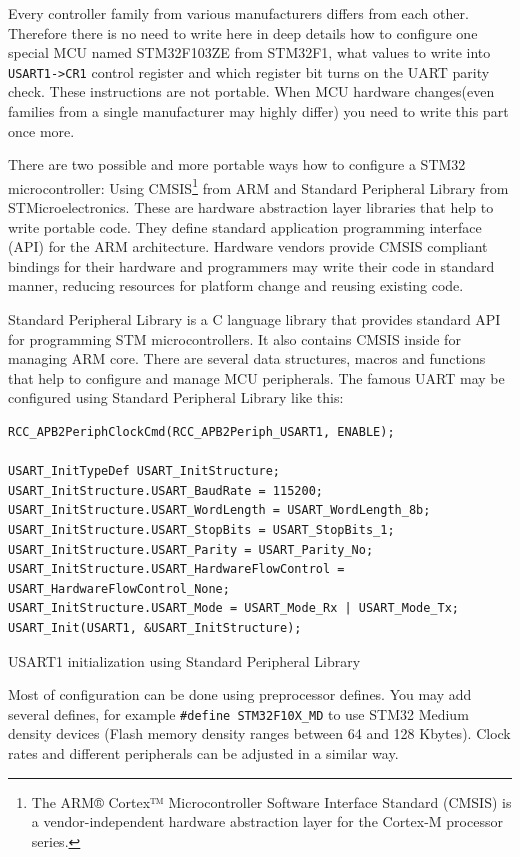 Every controller family from various manufacturers differs from each other.
Therefore there is no need to write here in deep details how to configure one
special MCU named STM32F103ZE from STM32F1, what values to write into
\texttt{USART1->CR1} control register and which register bit turns on the UART
parity check. These instructions are not portable. When MCU hardware
changes(even families from a single manufacturer may highly differ) you need to
write this part once more.

There are two possible and more portable ways how to configure a STM32
microcontroller: Using CMSIS\footnote{The ARM® Cortex™ Microcontroller Software
Interface Standard (CMSIS) is a vendor-independent hardware abstraction layer for the Cortex-M processor series.}
from ARM and Standard Peripheral Library from STMicroelectronics. These are
hardware abstraction layer libraries that help to write portable code. They
define standard  application programming interface (API) for the ARM
architecture. Hardware vendors provide CMSIS compliant bindings for their
hardware and programmers may write their code in standard manner, reducing
resources for platform change and reusing existing code.

Standard Peripheral Library is a C language library that provides standard API
for programming STM microcontrollers. It also contains CMSIS inside for
managing ARM core. There are several data structures, macros and functions that
help to configure and manage MCU peripherals.
The famous UART may be configured using Standard Peripheral Library like this:

\begin{listing}[H]
\begin{verbatim}
RCC_APB2PeriphClockCmd(RCC_APB2Periph_USART1, ENABLE);

USART_InitTypeDef USART_InitStructure;
USART_InitStructure.USART_BaudRate = 115200;
USART_InitStructure.USART_WordLength = USART_WordLength_8b;
USART_InitStructure.USART_StopBits = USART_StopBits_1;
USART_InitStructure.USART_Parity = USART_Parity_No;
USART_InitStructure.USART_HardwareFlowControl = USART_HardwareFlowControl_None;
USART_InitStructure.USART_Mode = USART_Mode_Rx | USART_Mode_Tx;
USART_Init(USART1, &USART_InitStructure);
\end{verbatim}
\caption{USART1 initialization using Standard Peripheral Library}
\label{lst:uart_init_example}
\end{listing} 

Most of configuration can be done using preprocessor defines.
You may add several defines, for example \texttt{\#define STM32F10X\_MD} to use
STM32 Medium density devices (Flash memory density ranges between 64 and 128
Kbytes). Clock rates and different peripherals can be adjusted in a similar way.

